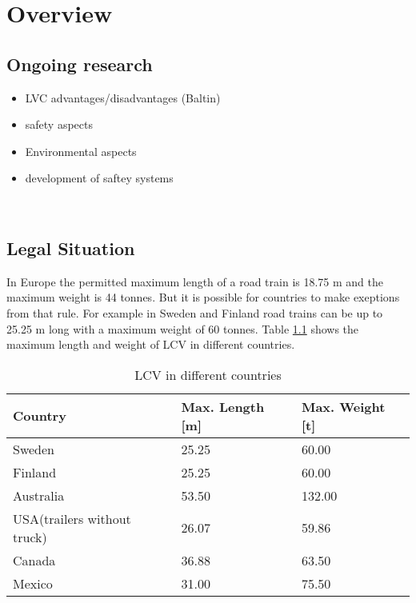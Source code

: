 \documentclass[ExampleMasters.tex]{subfiles}
\begin{document}
\clearpage
\chapter{Overview}
\label{chap:overview}
\section{Ongoing research}
\begin{itemize}
	\item LVC advantages/disadvantages (Baltin)
	\item safety aspects
	\item Environmental aspects
	\item development of saftey systems
\end{itemize}  \\


\label{sec:ongoing_research}
\section{Legal Situation}
\label{sec:legal_situation}
In Europe the permitted maximum length of a road train is 18.75 m and the maximum weight is 44 tonnes. But it is possible for countries to make exeptions from that rule.\cite{96/53/EC}  For example in Sweden and Finland road trains can be up to 25.25 m long with a  maximum weight of 60 tonnes.\cite{Vaegverket}
Table \ref{tab:LCV_in_different_countries} shows the maximum length and weight of LCV in different countries.

\begin{table}[h]
	\centering
	\caption{LCV in different countries\cite{Vaegverket}\cite{LCV_Australia}\Cite{LCV_USA}\cite{LCV_Canada}\Cite{LCV_Mexico}}
	\label{tab:LCV_in_different_countries}
	\begin{tabular}{l|l|l|}
		Country   & Max. Length [m] & Max. Weight [t] \\ \hline
		Sweden    &       25.25      &       60.00      \\
		Finland   &            25.25 &         60.00    \\
		Australia &      53.50       &           132.00  \\
		USA(trailers without truck)&      26.07       &    59.86        \\
		Canada & 36.88 & 63.50 \\
		Mexico & 31.00 & 75.50 \\
	\end{tabular} \\
\end{table}
\end{document}
